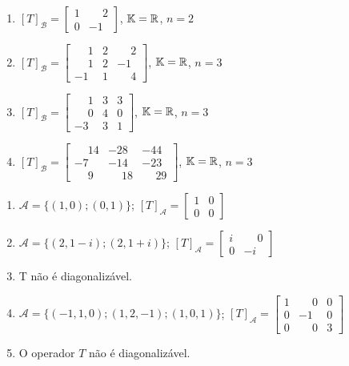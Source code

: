 \documentclass[12pt]{exam}
\begin{document}
\begin{exercicio}
\begin{enumerate}[label=({\alph*})]
    \item $[T]_\mathcal{B} = \begin{bmatrix} 1 & \phantom{-} 2\\ 0 & -1\end{bmatrix}$, $\mathbb{K} = \mathbb{R}$, $n = 2$
    \item $[T]_\mathcal{B} = \begin{bmatrix} \phantom{-} 1 & 2 & \phantom{-} 2\\ \phantom{-} 1 & 2 & -1\\ -1 & 1 & \phantom{-} 4\end{bmatrix}$, $\mathbb{K} = \mathbb{R}$, $n = 3$
    \item $[T]_\mathcal{B} = \begin{bmatrix} \phantom{-} 1 & 3 & 3\\ \phantom{-} 0 & 4 & 0\\ -3 & 3 & 1\end{bmatrix}$, $\mathbb{K} = \mathbb{R}$, $n = 3$
    \item $[T]_\mathcal{B} = \begin{bmatrix} \phantom{-} 14 & -28 & -44\\ -7 & -14 & -23\\ \phantom{-} 9 & \phantom{-} 18 & \phantom{-} 29\end{bmatrix}$, $\mathbb{K} = \mathbb{R}$, $n = 3$
  \end{enumerate}
  \begin{solucao}
      \begin{enumerate}[label=({\alph*})]
          \item $\mathcal{A} = \{(1,0);(0,1)\}$; $[T]_\mathcal{A} = \begin{bmatrix} 1 & 0\\ 0 & 0\end{bmatrix}$
          \item $\mathcal{A} = \{(2,1 - i);(2,1 + i)\}$; $[T]_\mathcal{A} = \begin{bmatrix} i & \phantom{-} 0\\ 0 & -i\end{bmatrix}$
          \item T n\~ao \'e diagonaliz\'avel.
          \item $\mathcal{A} = \{(-1,1,0);(1,2,-1);(1,0,1)\}$; $[T]_\mathcal{A} = \begin{bmatrix} 1 & \phantom{-} 0 & 0\\ 0 & -1 & 0\\0 & \phantom{-} 0 & 3\end{bmatrix}$
          \item O operador $T$ n\~ao \'e diagonaliz\'avel.

\end{enumerate}
\end{solucao}
\end{exercicio}
\end{document}
